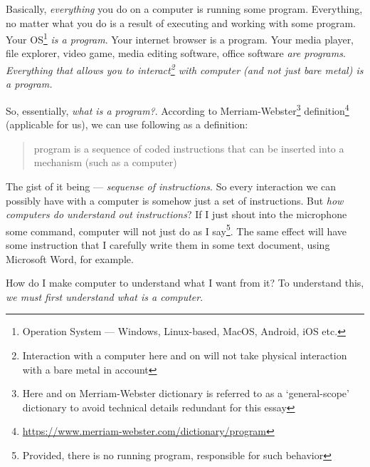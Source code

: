 \documentclass[../../../programming-introduction.tex]{subfiles}
\begin{document}
    Basically, \emph{everything} you do on a computer is running some program. Everything, no matter what you do is a result of executing and working with
    some program. Your OS\footnote{Operation System --- Windows, Linux-based, MacOS, Android, iOS etc.} \emph{is a program}. Your internet browser is a program. 
    Your media player, file explorer, video game, media editing software, office software \emph{are programs}. 
    \emph{Everything that allows you to interact\footnote{Interaction with a computer here and on will not take physical interaction with a bare metal in account} 
    with computer (and not just bare metal) is a program.} \par

    So, essentially, \emph{what is a program?}. According to Merriam-Webster\footnote{Here and on Merriam-Webster dictionary is referred to as a `general-scope' dictionary to avoid technical details redundant for this essay} 
    definition\footnote{\href{https://www.merriam-webster.com/dictionary/program}{https://www.merriam-webster.com/dictionary/program}} 
    (applicable for us), we can use following as a definition: \par

    \begin{quote}
        program is a sequence of coded instructions that can be inserted into a mechanism (such as a computer)
    \end{quote}

    The gist of it being --- \emph{sequense of instructions}. So every interaction we can possibly have with a computer is somehow just a set of instructions. But \emph{how computers
    do understand out instructions}? If I just shout into the microphone some command, computer will not just do as I say\footnote{Provided, there is no running program, responsible for such behavior}.
    The same effect will have some instruction that I carefully write them in some text document, using Microsoft Word, for example. \par
    How do I make computer to understand what I want from it? To understand this, \emph{we must first understand what is a computer}. \par
\end{document}
